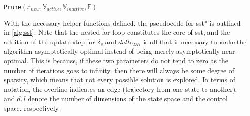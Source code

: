\begin{algorithm}
\caption{\texttt{Prune}$(x_{new}, \mathbb{V}_{active}, \mathbb{V}_{inactive}, \mathbb{E})$}
\label{alg:prune}
\begin{algorithmic}[1]
    \EndIf{}
    \EndWhile{}
\end{algorithmic}{}
\end{algorithm}

With the necessary helper functions defined, the pseudocode for \gls{sst}* is outlined in \autoref{alg:sst}. Note that the nested for-loop constitutes the core of \gls{sst}, and the addition of the update step for $\delta_s$ and $delta_{BN}$ is all that is necessary to make the algorithm asymptotically optimal instead of being merely asymptotically near-optimal. This is because, if these two parameters do not tend to zero as the number of iterations goes to infinity, then there will always be some degree of sparsity, which means that not every possible solution is explored. In terms of notation, the overline indicates an edge (trajectory from one state to another), and $d, l$ denote the number of dimensions of the state space and the control space, respectively.

